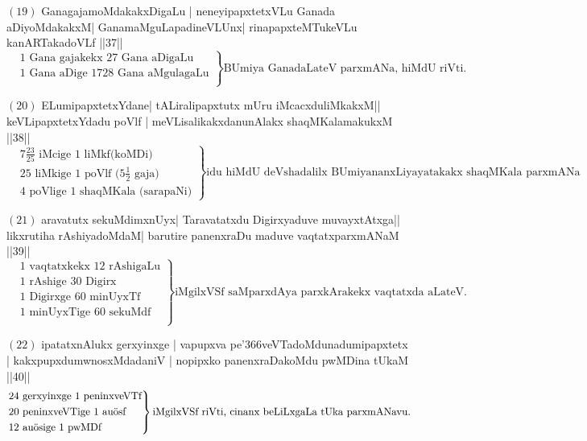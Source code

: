 $(19)$ GanagajamoMdakakxDigaLu | neneyipapxtetxVLu Ganada aDiyoMdakakxM| GanamaMguLapadineVLUnx| rinapapxteMTukeVLu kanARTakadoVLf ||37||
\begin{equation*}
\left.
\begin{aligned}
&\text{$1$ Gana gajakekx $27$ Gana aDigaLu}\\
&\text{$1$ Gana aDige $1728$ Gana aMgulagaLu}\\
\end{aligned}
\right\}
\text {BUmiya GanadaLateV parxmANa, hiMdU riVti.}
\end{equation*}

$(20)$ ELumipapxtetxYdane| tALiralipapxtutx mUru iMcacxduliMkakxM|| keVLipapxtetxYdadu poVlf | meVLisalikakxdanunAlakx shaqMKalamakukxM ||38||
\begin{equation*}
\left.
\begin{aligned}
&\text{$7\frac{23}{25}$ iMcige $1$ liMkf(koMDi)}\\
&\text{$25$ liMkige $1$ poVlf $(5\frac{1}{2}$ gaja)}\\
&\text{$4$ poVlige $1$ shaqMKala (sarapaNi)} 
\end{aligned}
\right\}
\text{idu hiMdU deVshadalilx BUmiyananxLiyayatakakx shaqMKala parxmANa}
\end{equation*}

$(21)$ aravatutx sekuMdimxnUyx| Taravatatxdu Digirxyaduve muvayxtAtxga|| likxrutiha rAshiyadoMdaM| barutire panenxraDu maduve vaqtatxparxmANaM ||39||
\begin{equation*}
\left.
\begin{aligned}
&\text{$1$ vaqtatxkekx $12$ rAshigaLu}\\
&\text{$1$ rAshige $30$ Digirx}\\
&\text{$1$ Digirxge $60$ minUyxTf}\\
&\text{$1$ minUyxTige $60$ sekuMdf}\\
\end{aligned}
\right\}
\text {iMgilxVSf saMparxdAya parxkArakekx vaqtatxda aLateV.}
\end{equation*}

$(22)$ ipatatxnAlukx gerxyinxge | vapupxva pe\char'366veVTadoMdunadumipapxtetx | kakxpupxdumwnosxMdadaniV | nopipxko panenxraDakoMdu pwMDina tUkaM ||40||
\begin{equation*}
\left.
\begin{aligned}
&\text{$24$ gerxyinxge $1$ peninxveVTf}\\
&\text{$20$ peninxveVTige $1$ au\char'366sf}\\
&\text{$12$ au\char'366sige $1$ pwMDf}\\
\end{aligned}
\right\}
\text {iMgilxVSf riVti, cinanx beLiLxgaLa tUka parxmANavu.}
\end{equation*} 


